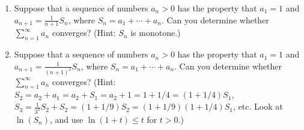 \documentclass{exercises}
\begin{document}
\begin{enumerate}[resume]
\begin{enumerate}[label=(\alph*)]
  \item Explain why the depleted harmonic series is bounded by $\sum_{d=1}^{\infty}\frac{h(d)}{m(d)}$.
  \item Show that $\sum_{d=1}^{\infty}\frac{h(d)}{m(d)}$ converges.
\end{enumerate}
\item Suppose that a sequence of numbers $a_{n}>0$ has the property that $a_{1}=1$ and $a_{n+1}=\frac{1}{n+1}S_{n}$, where $S_{n}=a_{1}+\cdots+a_{n}$. Can you determine whether $\sum_{n=1}^{\infty}a_{n}$ converges? (Hint: $S_{n}$ is monotone.)
\item Suppose that a sequence of numbers $a_{n}>0$ has the property that $a_{1}=1$ and $a_{n+1}=\frac{1}{(n+1)^{2}}S_{n}$, where $S_{n}=a_{1}+\cdots+a_{n}$. Can you determine whether $\sum_{n=1}^{\infty}a_{n}$ converges? (Hint: $S_{2}=a_{2}+a_{1}=a_{2}+S_{1}=a_{2}+1=1+1/4=(1+1/4)S_{1}$, $S_{3}=\frac{1}{3^{2}}S_{2}+S_{2}=(1+1/9)S_{2}=(1+1/9)(1+1/4)S_{1}$, etc. Look at $\ln(S_{n})$, and use $\ln(1+t)\le t$ for $t>0$.)
\end{enumerate}
\end{document}
